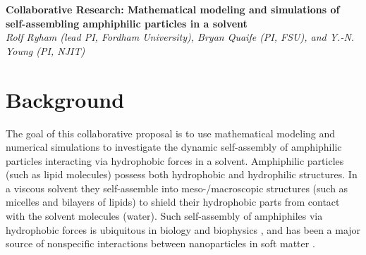\noindent
{\bf Collaborative Research: Mathematical modeling and simulations of
self-assembling amphiphilic particles in a solvent} \\
{\em Rolf Ryham (lead PI, Fordham University), Bryan Quaife (PI,
FSU), and Y.-N. Young (PI, NJIT)}
\section{Background}
\label{sec:background}
The goal of this collaborative proposal is to use mathematical modeling
and numerical simulations to investigate the dynamic self-assembly of
amphiphilic particles interacting via hydrophobic forces
in a solvent. Amphiphilic particles (such as lipid molecules) possess
both hydrophobic and hydrophilic structures. In a viscous solvent they
self-assemble into meso-/macroscopic structures (such as micelles and
bilayers of lipids) to shield their hydrophobic parts from contact with
the solvent molecules (water).
%
%
Such self-assembly of amphiphiles via hydrophobic forces is ubiquitous in biology and biophysics \cite{Israelachvili1954},
and has been a major source of nonspecific interactions between
nanoparticles in  soft matter
\cite{Sanchez-IglesiasEtAl2012_ACSNano,AltantzisEtAl2013_PSC,XieYangLuEtAl2020_COCIS}. 




